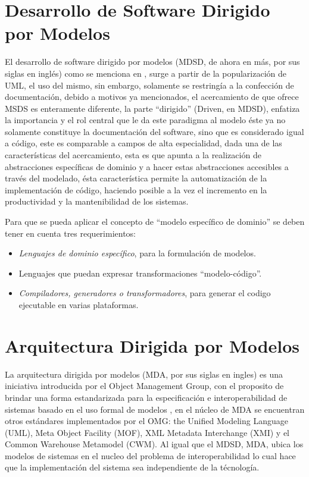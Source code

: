 \section{Desarrollo de Software Dirigido por Modelos}
\label{sec:mdsd}
El desarrollo de software dirigido por modelos (MDSD, de ahora en más, por sus
siglas en inglés) como se menciona en \cite{mdsd} , surge a partir de la popularización de UML,
el uso del mismo, sin embargo, solamente se restringía a la confección de
documentación, debido a motivos ya mencionados, el acercamiento de que ofrece
MSDS es enteramente diferente, la parte ``dirigido'' (Driven, en MDSD),
enfatiza la importancia y el rol central que le da este paradigma al modelo
éste ya no solamente constituye
la documentación del software, sino que es considerado igual a código, este es
comparable a campos de alta especialidad, dada una de las características del
acercamiento, esta es que apunta a la realización de abstracciones específicas de
dominio y a hacer estas abstracciones accesibles a través del modelado, ésta
característica permite la automatización de la implementación de código,
haciendo posible a la vez el incremento en la productividad y la mantenibilidad
de los sistemas.

Para que se pueda aplicar el concepto de ``modelo específico de dominio'' se
deben tener en cuenta tres requerimientos:
\begin{itemize}
	\item \textit{Lenguajes de dominio específico}, para la formulación de modelos.
	\item Lenguajes que puedan expresar transformaciones ``modelo-código''.
	\item \textit{Compiladores, generadores o transformadores}, para generar el codigo
		ejecutable en varias plataformas.
\end{itemize}

\section{Arquitectura Dirigida por Modelos}
\label{sec:arquitectura_dirigida_por_modelos}
La arquitectura dirigida por modelos (MDA, por sus siglas en ingles) es una
iniciativa introducida por el Object Management Group, con el proposito de
brindar una forma estandarizada para la especificación e interoperabilidad de
sistemas basado en el uso formal de modelos \cite{poole2001}, en el núcleo de
MDA se encuentran otros estándares implementados por el OMG: the Unified
Modeling Language (UML), Meta Object Facility (MOF), XML Metadata Interchange
(XMI) y el Common Warehouse Metamodel (CWM). Al igual que el MDSD, MDA, ubica
los modelos de sistemas en el nucleo del problema de interoperabilidad lo cual
hace que la implementación del sistema sea independiente de la técnología.

